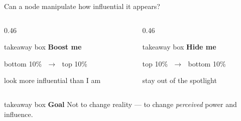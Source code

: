 \begin{frame}{Can a node manipulate how influential it appears?}
  \vspace{0.55cm}
  \begin{columns}[T,onlytextwidth]
    \begin{column}{0.46\textwidth}
      \begin{beamercolorbox}[wd=\linewidth,rounded=true,sep=0.55em]{takeaway box}
        {\color{PresFourIncrease}\bfseries Boost me}\par
        bottom 10\%\ \,$\rightarrow$\,\ top 10\%\par
        {\scriptsize\color{PresFourMuted}look more influential than I am}
      \end{beamercolorbox}
    \end{column}
    \begin{column}{0.46\textwidth}
      \begin{beamercolorbox}[wd=\linewidth,rounded=true,sep=0.55em]{takeaway box}
        {\color{PresFourDecrease}\bfseries Hide me}\par
        top 10\%\ \,$\rightarrow$\,\ bottom 10\%\par
        {\scriptsize\color{PresFourMuted}stay out of the spotlight}
      \end{beamercolorbox}
    \end{column}
  \end{columns}
  \vfill
  \begin{beamercolorbox}[wd=\linewidth,rounded=true,sep=0.55em]{takeaway box}
    {\color{PresFourAdversary}\bfseries Goal}\quad
    Not to change reality --- to change \emph{perceived} power and influence.
  \end{beamercolorbox}
\end{frame}

